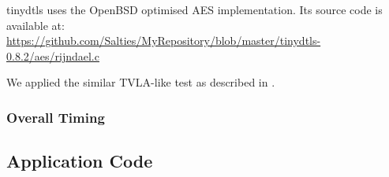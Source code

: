 tinydtls uses the OpenBSD optimised AES implementation. Its source code is available at:\\ 
\url{https://github.com/Salties/MyRepository/blob/master/tinydtls-0.8.2/aes/rijndael.c}

We applied the similar TVLA-like test as described in . 

\subsubsection{Overall Timing}

\subsection{Application Code}




